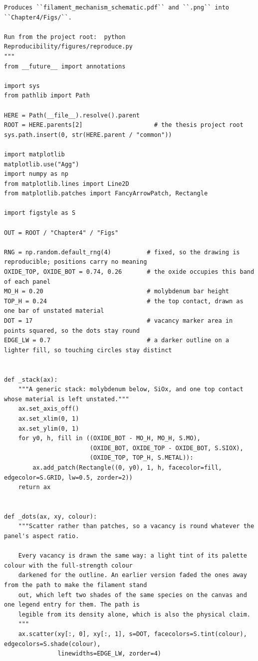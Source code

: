 \documentclass[a4paper,10pt]{article}
\begin{document}
\begin{Verbatim}
Produces ``filament_mechanism_schematic.pdf`` and ``.png`` into ``Chapter4/Figs/``.

Run from the project root:  python Reproducibility/figures/reproduce.py
"""
from __future__ import annotations

import sys
from pathlib import Path

HERE = Path(__file__).resolve().parent
ROOT = HERE.parents[2]                    # the thesis project root
sys.path.insert(0, str(HERE.parent / "common"))

import matplotlib
matplotlib.use("Agg")
import numpy as np
from matplotlib.lines import Line2D
from matplotlib.patches import FancyArrowPatch, Rectangle

import figstyle as S

OUT = ROOT / "Chapter4" / "Figs"

RNG = np.random.default_rng(4)          # fixed, so the drawing is reproducible; positions carry no meaning
OXIDE_TOP, OXIDE_BOT = 0.74, 0.26       # the oxide occupies this band of each panel
MO_H = 0.20                             # molybdenum bar height
TOP_H = 0.24                            # the top contact, drawn as one bar of unstated material
DOT = 17                                # vacancy marker area in points squared, so the dots stay round
EDGE_LW = 0.7                           # a darker outline on a lighter fill, so touching circles stay distinct


def _stack(ax):
    """A generic stack: molybdenum below, SiOx, and one top contact whose material is left unstated."""
    ax.set_axis_off()
    ax.set_xlim(0, 1)
    ax.set_ylim(0, 1)
    for y0, h, fill in ((OXIDE_BOT - MO_H, MO_H, S.MO),
                        (OXIDE_BOT, OXIDE_TOP - OXIDE_BOT, S.SIOX),
                        (OXIDE_TOP, TOP_H, S.METAL)):
        ax.add_patch(Rectangle((0, y0), 1, h, facecolor=fill, edgecolor=S.GRID, lw=0.5, zorder=2))
    return ax


def _dots(ax, xy, colour):
    """Scatter rather than patches, so a vacancy is round whatever the panel's aspect ratio.

    Every vacancy is drawn the same way: a light tint of its palette colour with the full-strength colour
    darkened for the outline. An earlier version faded the ones away from the path to make the filament stand
    out, which left two shades of the same species on the canvas and one legend entry for them. The path is
    legible from its density alone, which is also the physical claim.
    """
    ax.scatter(xy[:, 0], xy[:, 1], s=DOT, facecolors=S.tint(colour), edgecolors=S.shade(colour),
               linewidths=EDGE_LW, zorder=4)



\end{Verbatim}
\end{document}
